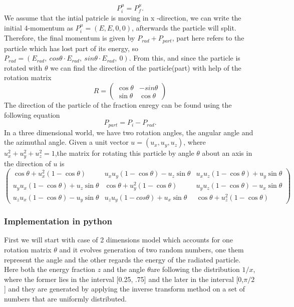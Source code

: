 \documentclass[12pt,a4paper]{article}
\begin{document}
\begin{equation}
P_{i}^{\mu} = P_f^{\mu}.
\end{equation} 
We assume that the intial patricle is moving in x -direction, we can write the initial 4-momentum as $P_i^{\mu} = (E,E,0,0)$, afterwards the particle will split. Therefore, the final momentum is given by $P_{rad} + P_{part}$, part here refers to the particle which has lost part of its energy, so $P_{rad} = (E_{rad},\  cos\theta \cdot E_{rad},\  sin\theta \cdot E_{rad},\ 0)$. From this, and since the particle is rotated with $\theta$ we can find the direction of the particle(part) with help of the rotation matrix \begin{equation} R = 
\begin{pmatrix}
\cos\theta & - sin\theta\\
\sin\theta & \cos\theta
\end{pmatrix}
\end{equation} The direction of the particle of the fraction enregy can be found using the following equation  \begin{equation}
P_{part} = P_{i} - P_{rad} .
\end{equation}    
In a three dimensional world, we have two rotation angles, the angular angle and the azimuthal angle. Given a unit vector $u =(u_x, u_y, u_z) $, where $u_x^2 + u_y^2 + u_z^2 = 1$,the matrix for rotating this particle by angle $\theta$ about an axis in the direction of $u$ is   
\begin{equation} 
\begin{pmatrix}
\cos\theta + u^2_x(1-\cos\theta) & u_x u_y (1-\cos\theta) - u_z \sin\theta& u_x u_z(1-\cos\theta)+ u_y \sin\theta\\

u_y u_x (1 - \cos\theta) + u_z \sin\theta & \cos\theta + u_y^2 (1 - \cos\theta) & u_y u_z (1 - \cos\theta) - u_x \sin\theta \\

u_z u_x (1 - \cos\theta) - u_y \sin\theta & u_z u_y (1 - cos\theta) + u_x \sin\theta & \cos\theta + u_z^2 (1 - \cos\theta)
\end{pmatrix}
\end{equation} 
\subsubsection{Implementation in python}
First we will start with case of 2 dimensions model which accounts for one rotation matrix $\theta$ and it evolves generation of two random numbers, one them represent the angle and the other regards the energy of the radiated particle. Here both the energy fraction $z$ and the angle $\theta$are following the distribution $1/x$, where the former lies in the interval [0.25, .75] and the later in the interval [0,$\pi/2$] and they are generated by applying the inverse transform method on a set of numbers that are uniformly distributed. 
\end{document}
